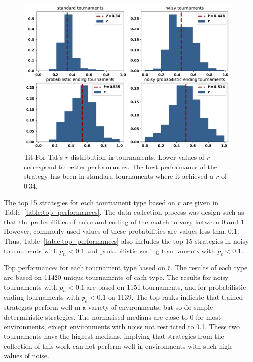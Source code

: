 \documentclass{article}
\begin{document}
\begin{figure}[!htbp]
    \centering
    \includegraphics[width=.60\textwidth]{../images/tit_for_tat_r_distributions.pdf}
    \caption{Tit For Tat's $r$ distribution in tournaments. Lower values of \(r\)
    correspond to better performances. The best performance
    of the strategy has been in standard tournaments where it achieved a $\bar{r}$
    of 0.34.}
    \label{fig:tit_for_tat_r_distribution}
\end{figure}

The top 15 strategies for each tournament type based on \(\bar{r}\) are given in
Table~\ref{table:top_performances}. The data collection process was design such
as that the probabilities of noise and ending of the match to vary between 0 and
1. However, commonly used values of these probabilities are
values less than 0.1. Thus,
Table~\ref{table:top_performances} also includes the top 15 strategies in noisy
tournaments with \(p_n < 0.1\) and probabilistic ending tournaments with \(p_e <
0.1\).

\begin{table}[!htbp]
    \begin{center}
    \resizebox{\textwidth}{!}{
        
    }
\end{center}
\caption{Top performances for each tournament type based on $\bar{r}$. The results
of each type are based on 11420 unique tournaments of each type. The results
for noisy tournaments with \(p_n < 0.1\) are based on 1151 tournaments, and 
for probabilistic ending tournaments with \(p_e < 0.1\) on 1139. The top ranks
indicate that trained strategies perform well in a variety of environments,
but so do simple deterministic strategies. The normalised medians are close to 0
for most environments, except environments with noise not restricted to 0.1.
These two tournaments have the highest medians, implying that strategies from
the collection of this work can not perform well in environments with such high
values of noise.}
\label{table:top_performances}
\end{table}
\end{document}
